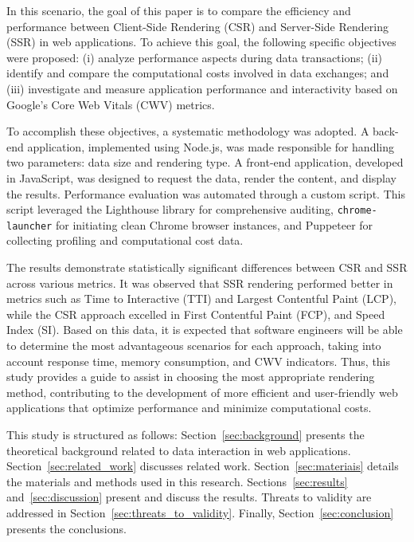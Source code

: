 In this scenario, the goal of this paper is to compare the efficiency and performance between Client-Side Rendering (CSR) and Server-Side Rendering (SSR) in web applications. To achieve this goal, the following specific objectives were proposed: (i) analyze performance aspects during data transactions; (ii) identify and compare the computational costs involved in data exchanges; and (iii) investigate and measure application performance and interactivity based on Google's Core Web Vitals (CWV) metrics.

To accomplish these objectives, a systematic methodology was adopted. A back-end application, implemented using Node.js, was made responsible for handling two parameters: data size and rendering type. A front-end application, developed in JavaScript, was designed to request the data, render the content, and display the results. Performance evaluation was automated through a custom script. This script leveraged the Lighthouse library for comprehensive auditing, \texttt{chrome-launcher} for initiating clean Chrome browser instances, and Puppeteer for collecting profiling and computational cost data.

The results demonstrate statistically significant differences between CSR and SSR across various metrics. It was observed that SSR rendering performed better in metrics such as Time to Interactive (TTI) and Largest Contentful Paint (LCP), while the CSR approach excelled in First Contentful Paint (FCP), and Speed Index (SI). Based on this data, it is expected that software engineers will be able to determine the most advantageous scenarios for each approach, taking into account response time, memory consumption, and CWV indicators. Thus, this study provides a guide to assist in choosing the most appropriate rendering method, contributing to the development of more efficient and user-friendly web applications that optimize performance and minimize computational costs.


This study is structured as follows: Section~\ref{sec:background} presents the theoretical background related to data interaction in web applications. Section~\ref{sec:related_work} discusses related work. Section~\ref{sec:materiais} details the materials and methods used in this research. Sections~\ref{sec:results} and~\ref{sec:discussion} present and discuss the results. Threats to validity are addressed in Section~\ref{sec:threats_to_validity}. Finally, Section~\ref{sec:conclusion} presents the conclusions.
